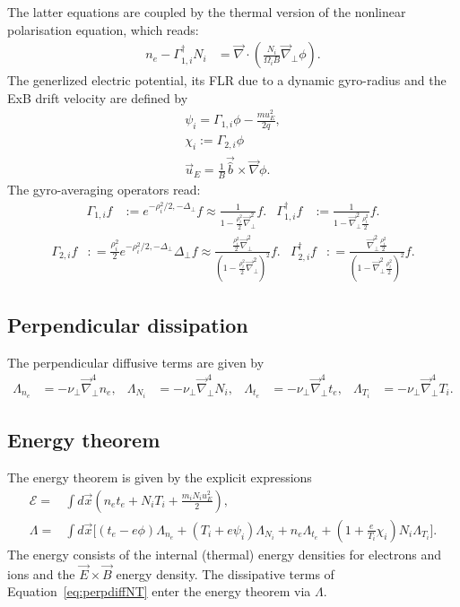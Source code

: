 The latter equations are coupled by the thermal version of the nonlinear polarisation equation, which reads:
\begin{align}
  n_e -\Gamma_{1,i}^\dagger N_i &= \vec{\nabla} \cdot\left(\frac{N_i}{\Omega_i B} \vec{\nabla}_\perp \phi\right).
\end{align}
The generlized electric potential, its FLR due to a dynamic gyro-radius and the ExB drift velocity are defined by
\begin{align}
 \psi_i  = \Gamma_{1,i} \phi - \frac{m u_E^2 }{2 q}, \\ 
 \chi_i := \Gamma_{2,i} \phi \\
 \vec{u}_E = \frac{1}{B} \vec{\hat{b}} \times \vec{\nabla} \phi .
\end{align}
The gyro-averaging operators read:
\begin{align}\label{eq:gamma1def} 
 \Gamma_{1,i} f&:= e^{-\rho_i^2/2, -\Delta_\perp} f \approx \frac{1}{1-\frac{\rho_i^2}{2}\vec{\nabla}_\perp^2} f. & 
  \Gamma_{1,i}^\dagger f&:= \frac{1}{1-\vec{\nabla}_\perp^2\frac{\rho_i^2}{2}} f.
\end{align}
\begin{align}\label{eq:gamma2def}
 \Gamma_{2,i} f&: = \frac{\rho_i^2}{2} e^{-\rho_i^2/2, -\Delta_\perp} \Delta_\perp f \approx \frac{\frac{\rho_i^2}{2}\vec{\nabla}_\perp^2}{\left(1-\frac{\rho_i^2}{2}\vec{\nabla}_\perp^2\right)^2} f.&
 \Gamma_{2,i}^\dagger f&: = \frac{\vec{\nabla}_\perp^2\frac{\rho_i^2}{2}}{\left(1-\vec{\nabla}_\perp^2\frac{\rho_i^2}{2}\right)^2} f. 
\end{align}
\subsection{Perpendicular dissipation}
The perpendicular diffusive terms are given by
\begin{align}\label{eq:perpdiffNT}
 \Lambda_{n_e} &=  -\nu_\perp \vec{\nabla}_\perp^4 n_e, &
 \Lambda_{N_i} &=  -\nu_\perp \vec{\nabla}_\perp^4 N_i, &
 \Lambda_{t_e} &=  -\nu_\perp \vec{\nabla}_\perp^4 t_e, &
 \Lambda_{T_i} &=  -\nu_\perp \vec{\nabla}_\perp^4 T_i.
\end{align}
\subsection{Energy theorem}
The energy theorem is given by the explicit expressions
\begin{align}\label{eq:energytheorem}
 \mathcal{E} =& \int d\vec{x} \left(n_e t_{e} +N_i T_{i} + \frac{m_i N_i u_E^2}{2} \right) , \\
\Lambda = &
 \int d\vec{x}  \bigg[\left(t_{e} - e \phi \right) \Lambda_{n_e}  +\left(T_{i} + e \psi_i \right) \Lambda_{N_i}  +
  n_e  \Lambda_{t_{e}}+ 
 \left(1+\frac{e}{T_{i}} \chi_i\right)N_i  \Lambda_{T_{i}}\bigg].
\end{align}
The energy consists of the internal (thermal) energy densities for electrons and ions and the $\vec{E}\times\vec{B}$ energy density. 
The dissipative terms of Equation~\eqref{eq:perpdiffNT} enter the energy theorem via $\Lambda$. \\
